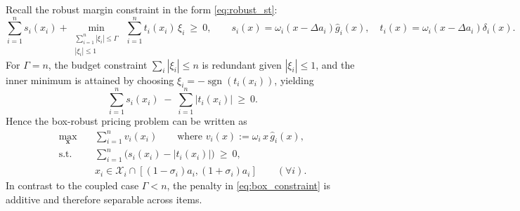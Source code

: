 \documentclass[11pt, a4paper]{article}
\theoremstyle{plain}
\theoremstyle{definition}
\theoremstyle{remark}
\begin{document}
Recall the robust margin constraint in the form \eqref{eq:robust_st}:
\[
\sum_{i=1}^n s_i(x_i) + \min_{\substack{\sum_{i=1}^n|\xi_i|\le \Gamma\\|\xi_i|\le 1}} \ \sum_{i=1}^n t_i(x_i)\,\xi_i \ \ge\ 0,
\qquad
s_i(x)=\omega_i(x-\Delta a_i)\hat g_i(x),\quad
t_i(x)=\omega_i(x-\Delta a_i)\delta_i(x).
\]
For $\Gamma=n$, the budget constraint $\sum_i|\xi_i|\le n$ is redundant given $|\xi_i|\le 1$, and the inner minimum is attained by choosing
$\xi_i=-\operatorname{sgn}(t_i(x_i))$, yielding
\begin{equation}\label{eq:box_constraint}
\sum_{i=1}^n s_i(x_i)\;-\;\sum_{i=1}^n |t_i(x_i)|\ \ge\ 0.
\end{equation}
Hence the box-robust pricing problem can be written as
\begin{align}
    \max_{\bm{x}} \quad & \sum_{i=1}^n v_i(x_i)
\qquad\text{where } v_i(x):=\omega_i\,x\,\hat g_i(x), \label{eq:box_problem}\\
    \text{s.t.} \quad & \sum_{i=1}^n\Big(s_i(x_i)-|t_i(x_i)|\Big)\ \ge\ 0, \nonumber\\
    & x_i \in \mathcal X_i\cap[(1-\sigma_i)a_i,(1+\sigma_i)a_i]\qquad(\forall i). \nonumber
\end{align}
In contrast to the coupled case $\Gamma<n$, the penalty in \eqref{eq:box_constraint} is additive and therefore separable across items.
\end{document}
